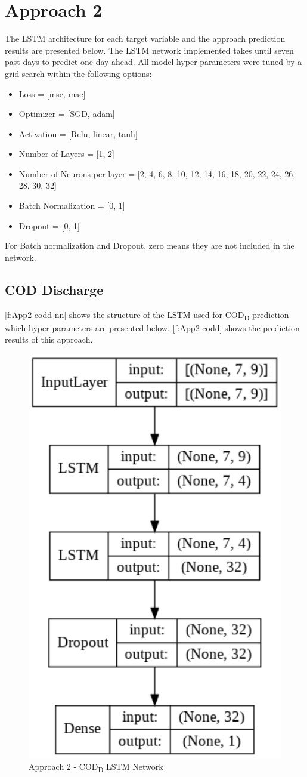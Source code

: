 \section{Approach 2}
The \ac{LSTM} architecture for each target variable and the approach prediction results are presented below. The \ac{LSTM} network implemented takes until seven past days to predict one day ahead.
All model hyper-parameters were tuned by a grid search within the following options:

\begin{itemize}
    \item Loss = [mse, mae]
    \item Optimizer = [SGD, adam]
    \item Activation = [Relu, linear, tanh]
    \item Number of Layers = [1, 2]
    \item Number of Neurons per layer = [2, 4, 6, 8, 10, 12, 14, 16, 18, 20, 22, 24, 26, 28, 30, 32]
    \item Batch Normalization = [0, 1]
    \item Dropout = [0, 1]
\end{itemize}

For Batch normalization and Dropout, zero means they are not included in the network.

\subsection{COD Discharge}
\autoref{f:App2-codd-nn} shows the structure of the \ac{LSTM} used for \ac{COD}\textsubscript{D} prediction which hyper-parameters are presented below. \autoref{f:App2-codd} shows the prediction results of this approach.

\begin{figure}[h]
\centering
 \includegraphics[width=0.4\linewidth]{figures/Ch5/App2_CODd.pdf}
\caption{Approach 2 - COD\textsubscript{D} LSTM Network}
\label{f:App2-codd-nn}
\end{figure}

